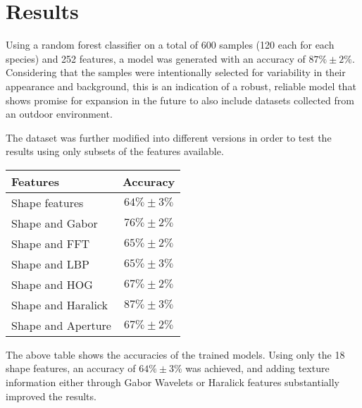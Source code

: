 \section{Results}

Using a random forest classifier on a total of 600 samples (120 each for each species) and 252 features, a model was generated with an accuracy of $87\% \pm 2\%$. Considering that the samples were intentionally selected for variability in their appearance and background, this is an indication of a robust, reliable model that shows promise for expansion in the future to also include datasets collected from an outdoor environment. 

The dataset was further modified into different versions in order to test the results using only subsets of the features available.

\begin{table}
        \begin{tabular}{ l c }
            \toprule
            Features & Accuracy \\ \midrule
            Shape features & $64\% \pm 3\%$ \\ 
            Shape and Gabor & $76\% \pm 2\%$ \\ 
            Shape and FFT & $65\% \pm 2\%$ \\ 
            Shape and LBP & $65\% \pm 3\%$ \\ 
            Shape and HOG & $67\% \pm 2\%$ \\ 
            Shape and Haralick & $87\% \pm 3\%$ \\ 
            Shape and Aperture & $67\% \pm 2\%$ \\ 
        \end{tabular} 
\end{table}

The above table shows the accuracies of the trained models. Using only the 18 shape features, an accuracy of $64\% \pm 3\%$ was achieved, and adding texture information either through Gabor Wavelets or Haralick features substantially improved the results.

  
  
  
  
  
  
  
  
  
  
  
  
  
  
  